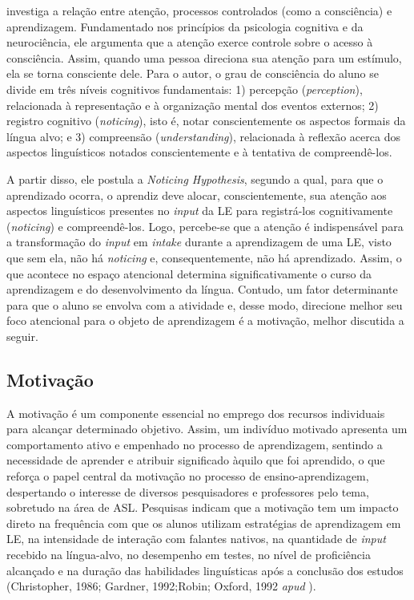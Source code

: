 \textcite{schmidit1990,schmidt1993awareness,schmidit2001} investiga a relação entre atenção, processos
controlados (como a consciência) e aprendizagem. Fundamentado nos
princípios da psicologia cognitiva e da neurociência, ele argumenta que
a atenção exerce controle sobre o acesso à consciência. Assim, quando
uma pessoa direciona sua atenção para um estímulo, ela se torna
consciente dele. Para o autor, o grau de consciência do aluno se divide
em três níveis cognitivos fundamentais: 1) percepção
(\emph{perception}), relacionada à representação e à organização mental
dos eventos externos; 2) registro cognitivo (\emph{noticing}), isto é,
notar conscientemente os aspectos formais da língua alvo; e 3)
compreensão (\emph{understanding}), relacionada à reflexão acerca dos
aspectos linguísticos notados conscientemente e à tentativa de
compreendê-los.

A partir disso, ele postula a \emph{Noticing Hypothesis}, segundo a
qual, para que o aprendizado ocorra, o aprendiz deve alocar,
conscientemente, sua atenção aos aspectos linguísticos presentes no
\emph{input} da LE para registrá-los cognitivamente (\emph{noticing}) e
compreendê-los. Logo, percebe-se que a atenção é indispensável para a
transformação do \emph{input} em \emph{intake} durante a aprendizagem de
uma LE, visto que sem ela, não há \emph{noticing} e, consequentemente,
não há aprendizado. Assim, o que acontece no espaço atencional determina
significativamente o curso da aprendizagem e do desenvolvimento da
língua. Contudo, um fator determinante para que o aluno se envolva com a
atividade e, desse modo, direcione melhor seu foco atencional para o
objeto de aprendizagem é a motivação, melhor discutida a seguir.

\subsection{Motivação}\label{sec-motivacao}

A motivação é um componente essencial no emprego dos recursos
individuais para alcançar determinado objetivo. Assim, um indivíduo
motivado apresenta um comportamento ativo e empenhado no processo de
aprendizagem, sentindo a necessidade de aprender e atribuir significado
àquilo que foi aprendido, o que reforça o papel central da motivação no
processo de ensino-aprendizagem, despertando o interesse de diversos
pesquisadores e professores pelo tema, sobretudo na área de ASL.
Pesquisas indicam que a motivação tem um impacto direto na frequência
com que os alunos utilizam estratégias de aprendizagem em LE, na
intensidade de interação com falantes nativos, na quantidade de
\emph{input} recebido na língua-alvo, no desempenho em testes, no nível
de proficiência alcançado e na duração das habilidades linguísticas após
a conclusão dos estudos (Christopher, 1986; Gardner, 1992;Robin; Oxford, 1992 \emph{apud} \textcite{oxford1994language}).

